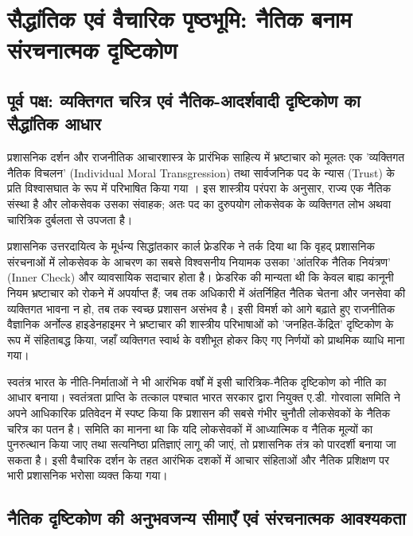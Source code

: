 \documentclass[11pt, a4paper]{article}
\begin{document}
\section{सैद्धांतिक एवं वैचारिक पृष्ठभूमि: नैतिक बनाम संरचनात्मक दृष्टिकोण}

\subsection{पूर्व पक्ष: व्यक्तिगत चरित्र एवं नैतिक-आदर्शवादी दृष्टिकोण का सैद्धांतिक आधार}

प्रशासनिक दर्शन और राजनीतिक आचारशास्त्र के प्रारंभिक साहित्य में भ्रष्टाचार को मूलतः एक 'व्यक्तिगत नैतिक विचलन' (Individual Moral Transgression) तथा सार्वजनिक पद के न्यास (Trust) के प्रति विश्वासघात के रूप में परिभाषित किया गया \citep{dobel1978, philp1997, thompson1993}। इस शास्त्रीय परंपरा के अनुसार, राज्य एक नैतिक संस्था है और लोकसेवक उसका संवाहक; अतः पद का दुरुपयोग लोकसेवक के व्यक्तिगत लोभ अथवा चारित्रिक दुर्बलता से उपजता है।

प्रशासनिक उत्तरदायित्व के मूर्धन्य सिद्धांतकार कार्ल फ्रेडरिक \citep{friedrich1940} ने तर्क दिया था कि वृहद् प्रशासनिक संरचनाओं में लोकसेवक के आचरण का सबसे विश्वसनीय नियामक उसका 'आंतरिक नैतिक नियंत्रण' (Inner Check) और व्यावसायिक सदाचार होता है। फ्रेडरिक की मान्यता थी कि केवल बाह्य कानूनी नियम भ्रष्टाचार को रोकने में अपर्याप्त हैं; जब तक अधिकारी में अंतर्निहित नैतिक चेतना और जनसेवा की व्यक्तिगत भावना न हो, तब तक स्वच्छ प्रशासन असंभव है। इसी विमर्श को आगे बढ़ाते हुए राजनीतिक वैज्ञानिक अर्नोल्ड हाइडेनहाइमर \citep{heidenheimer1970} ने भ्रष्टाचार की शास्त्रीय परिभाषाओं को 'जनहित-केंद्रित' दृष्टिकोण के रूप में संहिताबद्ध किया, जहाँ व्यक्तिगत स्वार्थ के वशीभूत होकर किए गए निर्णयों को प्राथमिक व्याधि माना गया।

स्वतंत्र भारत के नीति-निर्माताओं ने भी आरंभिक वर्षों में इसी चारित्रिक-नैतिक दृष्टिकोण को नीति का आधार बनाया। स्वतंत्रता प्राप्ति के तत्काल पश्चात भारत सरकार द्वारा नियुक्त ए.डी. गोरवाला समिति \citep{gorwala1951} ने अपने आधिकारिक प्रतिवेदन में स्पष्ट किया कि प्रशासन की सबसे गंभीर चुनौती लोकसेवकों के नैतिक चरित्र का पतन है। समिति का मानना था कि यदि लोकसेवकों में आध्यात्मिक व नैतिक मूल्यों का पुनरुत्थान किया जाए तथा सत्यनिष्ठा प्रतिज्ञाएं लागू की जाएं, तो प्रशासनिक तंत्र को पारदर्शी बनाया जा सकता है। इसी वैचारिक दर्शन के तहत आरंभिक दशकों में आचार संहिताओं और नैतिक प्रशिक्षण पर भारी प्रशासनिक भरोसा व्यक्त किया गया।

\subsection{नैतिक दृष्टिकोण की अनुभवजन्य सीमाएँ एवं संरचनात्मक आवश्यकता}
\end{document}
